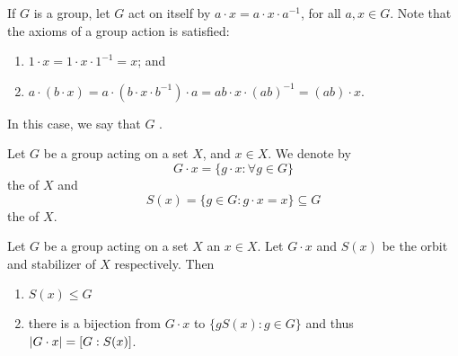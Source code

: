 \begin{eg}\label{eg:group_action_by_conjugation}
  If $G$ is a group, let $G$ act on itself by $a \cdot x = a \cdot x \cdot a^{-1}$, for all $a, x \in G$. Note that the axioms of a group action is satisfied:
  \begin{enumerate}
    \item $1 \cdot x = 1 \cdot x \cdot 1^{-1} = x$; and
    \item $a \cdot (b \cdot x) = a \cdot ( b \cdot x \cdot b^{-1} ) \cdot a = ab \cdot x \cdot (ab)^{-1} = (ab) \cdot x$.
  \end{enumerate}
  In this case, we say that $G$  .
\end{eg}

\begin{defn}
\label{defn:orbit_n_stabilizer}
  Let $G$ be a group acting on a set $X$, and $x \in X$. We denote by
  \begin{equation*}
    G \cdot x = \{g \cdot x : \forall g \in G \}
  \end{equation*}
  the  of $X$ and
  \begin{equation*}
    S(x) = \{g \in G : g \cdot x = x \} \subseteq G
  \end{equation*}
  the  of $X$.
\end{defn}

\begin{propo}
\label{propo:stabilizer_is_a_subgroup_and_index_of_stabilizer_is_order_of_orbit}
  Let $G$ be a group acting on a set $X$ an $x \in X$. Let $G \cdot x$ and $S(x)$ be the orbit and stabilizer of $X$ respectively. Then
  \begin{enumerate}
    \item $S(x) \leq G$
    \item there is a bijection from $G \cdot x$ to $\{g S(x) : g \in G \}$ and thus $\left|G \cdot x\right| = [G : S(x)]$.
  \end{enumerate}
\end{propo}

